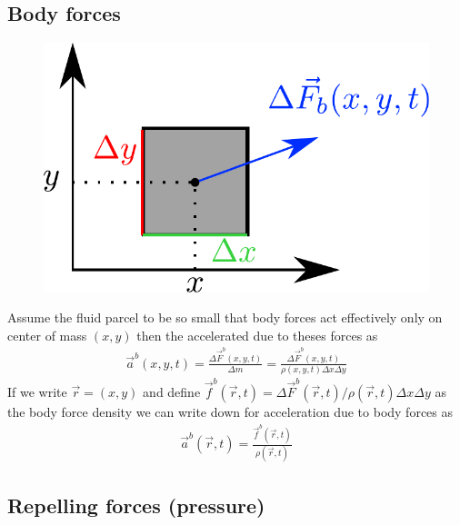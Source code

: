 \documentclass[10pt,a4paper]{article}
\begin{document}
\subsection{Body forces}

\begin{figure}[H]
\begin{center}
\includegraphics[scale=0.7]{body_forces.pdf}
\end{center}
\end{figure}
%
Assume the fluid parcel to be so small that body forces act effectively only on center of mass $(x,y)$ then the accelerated due to theses forces as
%
\begin{align}
\vec{a}^b(x,y,t) = \frac{\Delta \vec{F}^b(x,y,t)}{\Delta m} = \frac{\Delta \vec{F}^b(x,y,t)}{\rho(x,y,t)\Delta x \Delta y} 
\end{align}
%
If we write $\vec{r} = (x,y)$ and define $\vec{f}^b(\vec{r},t)={\Delta \vec{F}^b(\vec{r},t)}/{\rho(\vec{r},t)\Delta x \Delta y}$ as the body force density we can write down for acceleration due to body forces as
%
\begin{align}
\boxed{
\vec{a}^b(\vec{r},t) =  \frac{\vec{f}^b(\vec{r},t)}{\rho(\vec{r},t)}
}
\end{align}
%

\subsection{Repelling forces (pressure)}
\end{document}
